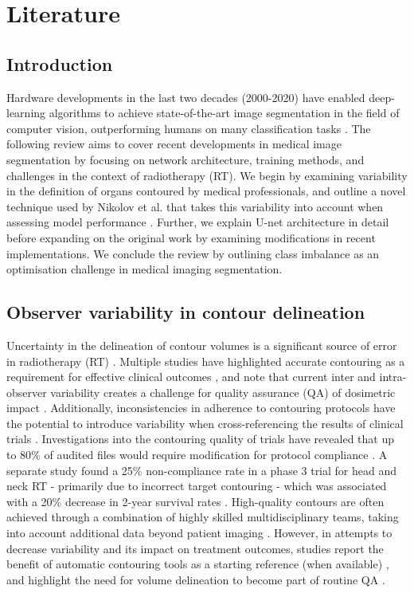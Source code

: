 \chapter{Literature} \label{ch:literature}

\section{Introduction}
Hardware developments in the last two decades (2000-2020) have enabled deep-learning algorithms to achieve state-of-the-art image segmentation in the field of computer vision, outperforming humans on many classification tasks \cite{ioffe2015, He2015, Wu2015}. The following review aims to cover recent developments in medical image segmentation by focusing on network architecture, training methods, and challenges in the context of radiotherapy (RT). We begin by examining variability in the definition of organs contoured by medical professionals, and outline a novel technique used by Nikolov et al. that takes this variability into account when assessing model performance \cite{Nikolov_2018}. Further, we explain U-net architecture in detail before expanding on the original work by examining modifications in recent implementations. We conclude the review by outlining class imbalance as an optimisation challenge in medical imaging segmentation.


\section{Observer variability in contour delineation}
 
Uncertainty in the delineation of contour volumes is a significant source of error in radiotherapy (RT) \cite{Nikolov_2018}. Multiple studies have highlighted accurate contouring as a requirement for effective clinical outcomes \cite{Vinod_2016, Roach_2019, Nemoto_2020}, and note that current inter and intra-observer variability creates a challenge for quality assurance (QA) of dosimetric impact \cite{Vinod_2016}. Additionally, inconsistencies in adherence to contouring protocols have the potential to introduce variability when cross-referencing the results of clinical trials \cite{Roach_2019}. Investigations into the contouring quality of trials have revealed that up to 80\% of audited files would require modification for protocol compliance \cite{Kachnic2013}. A separate study found a 25\% non-compliance rate in a phase 3 trial for head and neck RT - primarily due to incorrect target contouring - which was associated with a 20\% decrease in 2-year survival rates \cite{Peters2010}. High-quality contours are often achieved through a combination of highly skilled multidisciplinary teams, taking into account additional data beyond patient imaging \cite{Vinod_2016, Roach_2019}. However, in attempts to decrease variability and its impact on treatment outcomes, studies report the benefit of automatic contouring tools as a starting reference (when available) \cite{Vinod_2016}, and highlight the need for volume delineation to become part of routine QA \cite{Vinod_2016}. 

